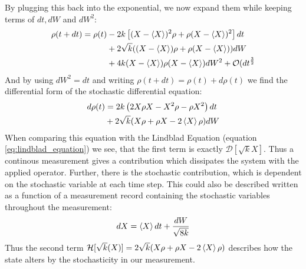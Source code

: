 By plugging this back into the exponential, we now expand them while keeping terms of $dt, dW$ and $dW^2$:
\begin{align*}
    \rho(t+ dt) = \rho(t) &- 2k\left[(X - \expval{X})^2\rho + \rho(X - \expval{X})^2 \right]dt \\
                          &+ 2\sqrt{k}((X -\expval{X})\rho + \rho(X -\expval{X}))dW \\
                          &+ 4k (X -\expval{X})\rho (X -\expval{X}) dW^2 + \mathcal{O}(dt^{\frac32}
\end{align*}
And by using $dW^2 = dt$ and writing $\rho(t +dt) = \rho(t) + d\rho(t)$ we find the differential form of the stochastic differential equation:
\begin{align}
    d\rho(t) &=  2k\left(2 X\rho X - X^2\rho - \rho X^2\right)dt \\
                          &+ 2\sqrt{k}(X\rho + \rho X - 2 \expval{X}\rho)dW
\end{align}
When comparing this equation with the Lindblad Equation (equation \ref{eq:lindblad_equation}) we see, that the first term is exactly $\mathcal{D}[\sqrt{k}X]$. Thus a continous measurement gives a contribution which dissipates the system with the applied operator. Further, there is the stochastic contribution, which is dependent on the stochastic variable at each time step. This could also be described written as a function of a measurement record containing the stochastic variables throughout the measurement:
\begin{equation}
    dX = \expval{X}dt + \frac{dW}{\sqrt{8k}}
\end{equation}
Thus the second term $\mathcal{H}[\sqrt{k}(X)]=2\sqrt{k}(X\rho + \rho X - 2 \expval{X}\rho)$ describes how the state alters by the stochasticity in our measurement.




